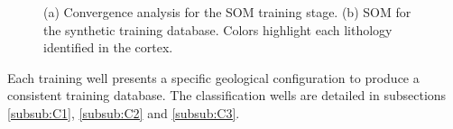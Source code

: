 \documentclass[preprint,12pt]{elsarticle}
\begin{document}
\begin{figure}[ht!]
	\begin{center}
		\caption{ (a) Convergence analysis for the SOM training stage. (b) SOM for the synthetic training database. Colors highlight each lithology identified in the cortex.}
		\label{fig:SOM}
	\end{center}
\end{figure}
Each training well presents a specific geological configuration to produce a consistent training database. The classification wells are detailed in subsections \ref{subsub:C1}, \ref{subsub:C2} and \ref{subsub:C3}.
\end{document}
